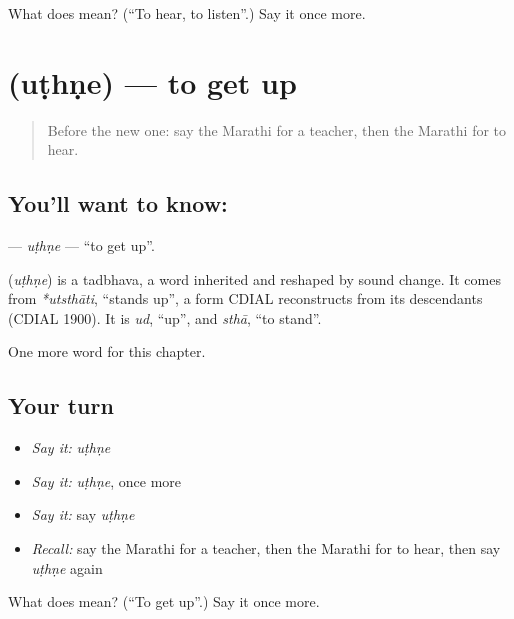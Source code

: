 \begin{tcolorbox}[breakable,colback=teal!4,colframe=teal!35!black,title={Before you move on}]
What does  mean? (\textquotedblleft{}To hear, to listen\textquotedblright{}.) Say it once more.
\end{tcolorbox}
\section[\texorpdfstring{\mr{उठणे} (uṭhṇe)}{उठणे (uṭhṇe)}]{ (uṭhṇe) — to get up}

\label{lesson:MR-C77-uthne}



\begin{quote}
Before the new one: say the Marathi for a teacher, then the Marathi for to hear.
\end{quote}

\subsection*{You'll want to know: }
\textbf{} — \emph{uṭhṇe} — \textquotedblleft{}to get up\textquotedblright{}.

\begin{cousinweb}
\textbf{} (\emph{uṭhṇe}) is a tadbhava, a word inherited and reshaped by sound change. It comes from \emph{*utsthāti}, \textquotedblleft{}stands up\textquotedblright{}, a form CDIAL reconstructs from its descendants (CDIAL 1900). It is \emph{ud}, \textquotedblleft{}up\textquotedblright{}, and \emph{sthā}, \textquotedblleft{}to stand\textquotedblright{}.
\end{cousinweb}

\begin{grammarlens}[title={What you've built}]
One more word for this chapter.
\end{grammarlens}

\subsection*{Your turn}
\begin{itemize}
\raggedright
  \item \emph{Say it:} \emph{uṭhṇe}
  \item \emph{Say it:} \emph{uṭhṇe}, once more
  \item \emph{Say it:} say \emph{uṭhṇe}
  \item \emph{Recall:} say the Marathi for a teacher, then the Marathi for to hear, then say \emph{uṭhṇe} again
\end{itemize}

\begin{tcolorbox}[breakable,colback=teal!4,colframe=teal!35!black,title={Before you move on}]
What does  mean? (\textquotedblleft{}To get up\textquotedblright{}.) Say it once more.
\end{tcolorbox}
